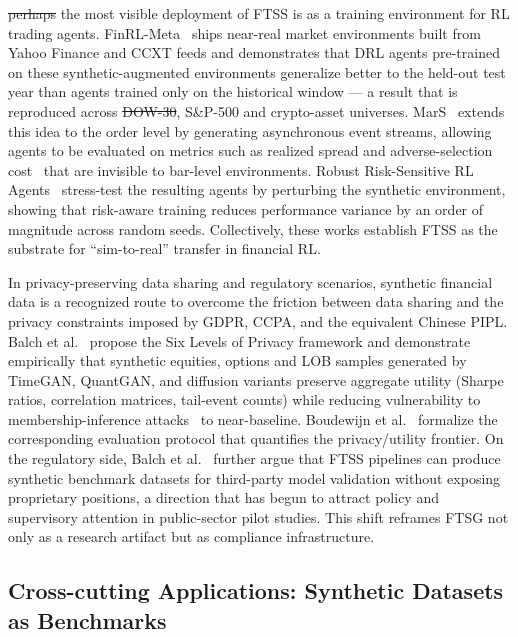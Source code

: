 \documentclass[11pt,a4paper]{article}
\makeatletter
\providecommand{\DIFaddtex}[1]{{\protect\color{blue}\uwave{#1}}} %
\providecommand{\DIFdeltex}[1]{{\protect\color{red}\sout{#1}}} %
\providecommand{\DIFaddbegin}{} %
\providecommand{\DIFaddend}{} %
\providecommand{\DIFdelbegin}{} %
\providecommand{\DIFdelend}{} %
\providecommand{\DIFadd}[1]{\texorpdfstring{\DIFaddtex{#1}}{#1}} %
\providecommand{\DIFdel}[1]{\texorpdfstring{\DIFdeltex{#1}}{}} %
\providecommand{\DIFscaledelfig}{0.5}
\newlength{\DIFdelgraphicswidth} %
\newlength{\DIFdelgraphicsheight} %
\providecommand{\DIFaddincludegraphics}[2][]{{\color{blue}\fbox{\DIFOincludegraphics[#1]{#2}}}} %
\providecommand{\DIFdelincludegraphics}[2][]{%
\sbox{\DIFdelgraphicsbox}{\DIFOincludegraphics[#1]{#2}}%
\settoboxwidth{\DIFdelgraphicswidth}{\DIFdelgraphicsbox} %
\settoboxtotalheight{\DIFdelgraphicsheight}{\DIFdelgraphicsbox} %
\scalebox{\DIFscaledelfig}{%
\parbox[b]{\DIFdelgraphicswidth}{\usebox{\DIFdelgraphicsbox}\\[-\baselineskip] \rule{\DIFdelgraphicswidth}{0em}}\llap{\resizebox{\DIFdelgraphicswidth}{\DIFdelgraphicsheight}{%
\setlength{\unitlength}{\DIFdelgraphicswidth}%
\begin{picture}(1,1)%
\thicklines\linethickness{2pt} %
{\color[rgb]{1,0,0}\put(0,0){\framebox(1,1){}}}%
{\color[rgb]{1,0,0}\put(0,0){\line( 1,1){1}}}%
{\color[rgb]{1,0,0}\put(0,1){\line(1,-1){1}}}%
\end{picture}%
}\hspace*{3pt}}} %
} %
\DeclareRobustCommand{\DIFaddbegin}{\DIFOaddbegin \let\includegraphics\DIFaddincludegraphics} %
\DeclareRobustCommand{\DIFaddend}{\DIFOaddend \let\includegraphics\DIFOincludegraphics} %
\DeclareRobustCommand{\DIFdelbegin}{\DIFOdelbegin \let\includegraphics\DIFdelincludegraphics} %
\DeclareRobustCommand{\DIFdelend}{\DIFOaddend \let\includegraphics\DIFOincludegraphics} %
\let\sout@orig\sout %
\renewcommand{\sout}[1]{\ifmmode\text{\sout@orig{\ensuremath{#1}}}\else\sout@orig{#1}\fi} %
\makeatother
\begin{document}
\DIFdelbegin \DIFdel{perhaps }\DIFdelend \DIFaddbegin \DIFadd{Perhaps }\DIFaddend the most visible deployment of FTSS is as a training environment for RL
trading agents. FinRL-Meta~\citep{liu2022finrlmeta} ships near-real
market environments built from Yahoo Finance and CCXT feeds and
demonstrates that DRL agents pre-trained on these synthetic-augmented
environments generalize better to the held-out test year than agents
trained only on the historical window --- a result that is reproduced
across \DIFdelbegin \DIFdel{DOW-30}\DIFdelend \DIFaddbegin \DIFadd{Dow-30}\DIFaddend , S\&P-500 and crypto-asset universes.
MarS~\citep{li2025mars} extends this idea to the order level by
generating asynchronous event streams, allowing agents to be evaluated
on metrics such as realized spread and adverse-selection cost~\citep{glosten1985bid,huang1996dealer} that are invisible to bar-level environments. Robust Risk-Sensitive RL
Agents~\citep{gao2021robust} stress-test the resulting agents by
perturbing the synthetic environment, showing that risk-aware training
reduces performance variance by an order of magnitude across random
seeds. Collectively, these works establish FTSS as the substrate for
``sim-to-real'' transfer in financial RL.

In privacy-preserving data sharing and regulatory scenarios, synthetic financial data is a recognized route to overcome the friction
between data sharing and the privacy constraints imposed by GDPR, CCPA,
and the equivalent Chinese PIPL. Balch et al.~\citep{balch2024six} propose the Six Levels of
Privacy framework and demonstrate empirically that synthetic equities, options and LOB
samples generated by TimeGAN, QuantGAN, and diffusion variants preserve
aggregate utility (Sharpe ratios, correlation matrices, tail-event
counts) while reducing vulnerability to membership-inference attacks~\citep{shokri2017membership} to
near-baseline. Boudewijn et al.~\citep{boudewijn2023privacy} formalize the corresponding
evaluation protocol that quantifies the privacy/utility frontier. On
the regulatory side, Balch et al.~\citep{balch2024six} further argue that FTSS pipelines can
produce synthetic benchmark datasets for third-party model validation
without exposing proprietary positions, a direction that has begun to
attract policy and supervisory attention in public-sector pilot studies.
This shift reframes FTSG not only as a research artifact but as
compliance infrastructure.

\subsection{Cross-cutting Applications: Synthetic Datasets as Benchmarks}
\end{document}
